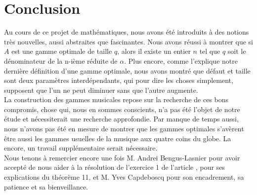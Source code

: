 \documentclass[moyen]{classeUPD}
\begin{document}
\clearpage
\chapter*{Conclusion}

Au cours de ce projet de mathématiques, nous avons été introduits à des notions très nouvelles, aussi abstraites que fascinantes. Nous avons réussi à montrer que si $A$ est une gamme optimale de taille $q$, alors il existe un entier $n$ tel que $q$ soit le dénominateur de la n-ième réduite de $\alpha$. Plus encore, comme l'explique notre dernière définition d'une gamme optimale, nous avons montré que défaut et taille sont deux paramètres interdépendants, qui pour dire les choses simplement, supposent que l'un ne peut diminuer sans que l'autre augmente.\\ La construction des gammes musicales repose sur la recherche de ces bons compromis, chose qui, nous en sommes conscients, n'a pas été l'objet de notre étude et nécessiterait une recherche approfondie. Par manque de temps aussi, nous n'avons pas été en mesure de montrer que les gammes optimales s'avèrent être aussi les gammes usuelles de la musique aux quatre coins du globe. La encore, un travail supplémentaire serait nécessaire.\\ Nous tenons à remercier encore une fois M. Andrei Bengus-Lasnier pour avoir accepté de nous aider à la résolution de l'exercice 1 de l'article \cite{caruso_application_nodate}, pour ses explications du théorème 11, et M. Yves Capdeboscq pour son encadrement, sa patience et sa bienveillance.

\newpage
\listoffigures
{}
\printbibliography
\end{document}
